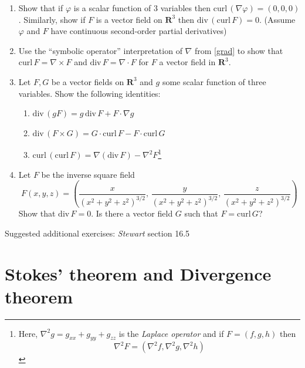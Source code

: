 \documentclass[12pt]{article}
\numberwithin{equation}{subsection}
\numberwithin{figure}{subsection}
\theoremstyle{note}
\newcommand{\curl}{\mathrm{curl\,}}
\newcommand{\dv}{\mathrm{div\,}}
\begin{document}
{\begin{enumerate}[label=\arabic*.]
\begin{enumerate}
	\item $\curl g$
	\item $(\curl F) \times (\nabla g)$
	\item $\dv (\dv F)$
	\item $\dv (\nabla g)$
	\item $\nabla(\dv F)$
	\end{enumerate}
	
	\item Show that if $\varphi$ is a scalar function of $3$ variables then $\curl(\nabla \varphi)=(0,0,0)$. Similarly, show if $F$ is a vector field on $\mathbf{R}^3$ then $\dv(\curl F)=0$. (Assume $\varphi$ and $F$ have continuous second-order partial derivatives)

\item Use the ``symbolic operator'' interpretation of $\nabla$ from \eqref{grad} to show that $\curl F= \nabla \times F$ and $\dv F= \nabla \cdot F$ for $F$ a vector field in $\mathbf{R}^3$.

\item  Let $F,G$ be a vector fields on $\mathbf{R}^3$ and $g$ some scalar function of three variables. Show the following identities:

\begin{enumerate}
	\item $\dv (gF)=g \,\dv F + F\cdot \nabla g$
	\item $\dv (F\times G)=G \cdot \curl F - F \cdot \curl G$
	\item $\curl( \curl F)=\nabla (\dv F) - \nabla^2 F$\footnote{Here, $\nabla^2 g= g_{xx}+g_{yy}+g_{zz}$ is the \textit{Laplace operator} and if $F=(f,g,h)$ then \[\nabla^2 F= (\nabla^2 f, \nabla^2 g, \nabla^2 h)\]}  

\end{enumerate}



\item Let $F$ be the inverse square field \[ F(x,y,z)=\left( \dfrac{x}{(x^2+y^2+z^2)^{3/2}}, \,\dfrac{y}{(x^2+y^2+z^2)^{3/2}} , \,\dfrac{z}{(x^2+y^2+z^2)^{3/2}} \right) \] 
Show that $\dv F=0$. Is there a vector field $G$ such that $F=\curl G$?
\end{enumerate}
Suggested additional exercises: \textit{Stewart} section 16.5


\section[Stokes' and Divergence theorem]{Stokes' theorem and Divergence theorem}

}
\end{document}
